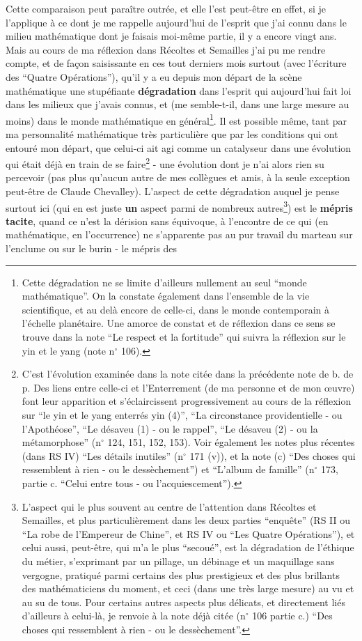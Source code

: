 Cette comparaison peut paraître outrée, et elle l'est peut-être en effet, si je l'applique à ce dont je me rappelle aujourd'hui de l'esprit que j'ai connu dans le milieu mathématique dont je faisais moi-même partie, il y a encore vingt ans. Mais au cours de ma réflexion dans Récoltes et Semailles j'ai pu me rendre compte, et de façon saisissante en ces tout derniers mois surtout (avec l'écriture des ``Quatre Opérations''), qu'il y a eu depuis mon départ de la scène mathématique une stupéfiante \textbf{dégradation} dans l'esprit qui aujourd'hui fait loi dans les milieux que j'avais connus, et (me semble-t-il, dans une large mesure au moins) dans le monde mathématique en général\footnote{Cette dégradation ne se limite d'ailleurs nullement au seul ``monde mathématique''. On la constate également dans l'ensemble de la vie scientifique, et au delà encore de celle-ci, dans le monde contemporain à l'échelle planétaire. Une amorce de constat et de réflexion dans ce sens se trouve dans la note ``Le respect et la fortitude'' qui suivra la réflexion sur le yin et le yang (note n$^{\circ}$ 106).}. Il est possible même, tant par ma personnalité mathématique très particulière que par les conditions qui ont entouré mon départ, que celui-ci ait agi comme un catalyseur dans une évolution qui était déjà en train de se faire\footnote{C'est l'évolution examinée dans la note citée dans la précédente note de b. de p. Des liens entre celle-ci et l'Enterrement (de ma personne et de mon œuvre) font leur apparition et s'éclaircissent progressivement au cours de la réflexion sur ``le yin et le yang enterrés yin (4)'', ``La circonstance providentielle - ou l'Apothéose'', ``Le désaveu (1) - ou le rappel'', ``Le désaveu (2) - ou la métamorphose'' (n$^{\circ}$ 124, 151, 152, 153). Voir également les notes plus récentes (dans RS IV) ``Les détails inutiles'' (n$^{\circ}$ 171 (v)), et la note (c) ``Des choses qui ressemblent à rien - ou le dessèchement'') et ``L'album de famille'' (n$^{\circ}$ 173, partie c. ``Celui entre tous - ou l'acquiescement'').} - une évolution dont je n'ai alors rien su percevoir (pas plus qu'aucun autre de mes collègues et amis, à la seule exception peut-être de Claude Chevalley). L'aspect de cette dégradation auquel je pense surtout ici (qui en est juste \textbf{un} aspect parmi de nombreux autres\footnote{L'aspect qui le plus souvent au centre de l'attention dans Récoltes et Semailles, et plus particulièrement dans les deux parties ``enquête'' (RS II ou ``La robe de l'Empereur de Chine'', et RS IV ou ``Les Quatre Opérations''), et celui aussi, peut-être, qui m'a le plus ``secoué'', est la dégradation de l'éthique du métier, s'exprimant par un pillage, un débinage et un maquillage sans vergogne, pratiqué parmi certains des plus prestigieux et des plus brillants des mathématiciens du moment, et ceci (dans une très large mesure) au vu et au su de tous. Pour certains autres aspects plus délicats, et directement liés d'ailleurs à celui-là, je renvoie à la note déjà citée (n$^{\circ}$ 106 partie c.) ``Des choses qui ressemblent à rien - ou le dessèchement''.}) est le \textbf{mépris tacite}, quand ce n'est la dérision sans équivoque, à l'encontre de ce qui (en mathématique, en l'occurrence) ne s'apparente pas au pur travail du marteau sur l'enclume ou sur le burin - le mépris des 